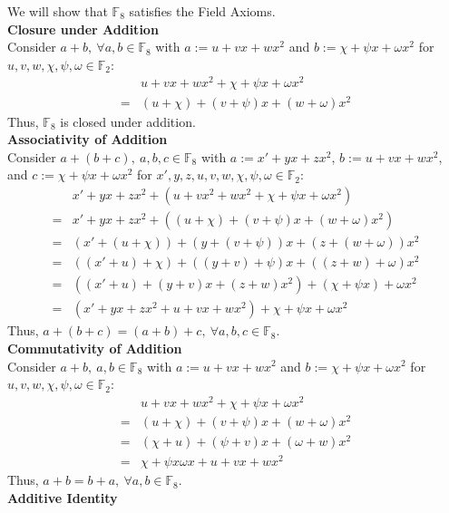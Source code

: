 \documentclass[11pt]{article}
\begin{document}
\begin{flushleft}
We will show that $\mathbb{F}_8$ satisfies the Field Axioms. \\
\bigskip
\textbf{Closure under Addition} \\
Consider $a + b, \ \forall a,b \in \mathbb{F}_8$ with $a := u + vx + wx^2$ and $b :=\chi + \psi x + \omega x^2$ for $u,v,w, \chi, \psi, \omega \in \mathbb{F}_2$:
\begin{align*}
& u + vx + wx^2 + \chi + \psi x + \omega x^2 \\
= & (u + \chi) + (v + \psi )x + (w + \omega ) x^2
\end{align*}
Thus, $\mathbb{F}_8$ is closed under addition. \\
\bigskip
\textbf{Associativity of Addition} \\
Consider $a + (b + c), \ a,b,c \in \mathbb{F}_8$ with $a := x' + yx + zx^2$, $b := u + vx + wx^2$, and $c :=\chi + \psi x + \omega x^2$ for $x',y,z,u,v,w, \chi, \psi, \omega \in \mathbb{F}_2$:
\begin{align*}
& x' + yx + zx^2 + (u + vx^2 + wx^2 + \chi + \psi x + \omega x^2 ) \\
= & x' + yx + zx^2 + ((u+ \chi) + (v+ \psi)x + (w + \omega )x^2) \\
= & (x' + (u + \chi)) + (y + (v + \psi))x + (z + (w + \omega))x^2 \\
= & ((x' + u) + \chi) + ((y + v) + \psi)x + ((z + w) + \omega)x^2 \\
= & ((x' + u) + (y + v)x + (z + w)x^2) + (\chi + \psi x) + \omega x^2 \\
= & (x' + yx + zx^2 + u + vx + wx^2) + \chi + \psi x + \omega x^2
\end{align*}
Thus, $a + (b + c) = (a + b) + c, \ \forall a,b,c \in \mathbb{F}_8$. \\ 
\bigskip
\textbf{Commutativity of Addition} \\
Consider $a + b, \ a,b \in \mathbb{F}_8$ with $a := u + vx + wx^2$ and $b := \chi + \psi x + \omega x^2$ for $u,v,w,\chi,\psi,\omega \in \mathbb{F}_2$:
\begin{align*}
& u + vx + wx^2 + \chi + \psi x + \omega x^2 \\
= & (u + \chi) + (v + \psi)x + (w + \omega) x^2 \\
= & (\chi + u) + (\psi + v)x + (\omega + w) x^2 \\
= & \chi + \psi x \omega x + u + vx + wx^2
\end{align*}
Thus, $a + b = b + a, \ \forall a,b \in \mathbb{F}_8$.
\\
\bigskip
\textbf{Additive Identity} \\

\end{flushleft}
\end{document}
